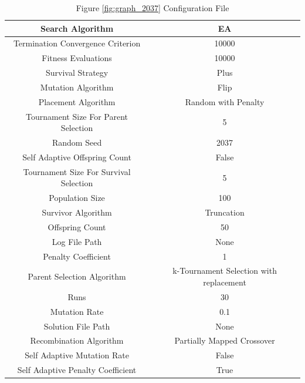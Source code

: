 \documentclass{standalone}
\begin{document}
\begin{table}[!htb]
	\centering
	\caption{Figure \ref{fig:graph_2037} Configuration File}
	\label{tab:graph_2037}
	\begin{tabular}{| c | c |}
		\hline
		Search Algorithm		& EA		 \\
		\hline
		Termination Convergence Criterion		& 10000		 \\
		\hline
		Fitness Evaluations		& 10000		 \\
		\hline
		Survival Strategy		& Plus		 \\
		\hline
		Mutation Algorithm		& Flip		 \\
		\hline
		Placement Algorithm		& Random with Penalty		 \\
		\hline
		Tournament Size For Parent Selection		& 5		 \\
		\hline
		Random Seed		& 2037		 \\
		\hline
		Self Adaptive Offspring Count		& False		 \\
		\hline
		Tournament Size For Survival Selection		& 5		 \\
		\hline
		Population Size		& 100		 \\
		\hline
		Survivor Algorithm		& Truncation		 \\
		\hline
		Offspring Count		& 50		 \\
		\hline
		Log File Path		& None		 \\
		\hline
		Penalty Coefficient		& 1		 \\
		\hline
		Parent Selection Algorithm		& k-Tournament Selection with replacement		 \\
		\hline
		Runs		& 30		 \\
		\hline
		Mutation Rate		& 0.1		 \\
		\hline
		Solution File Path		& None		 \\
		\hline
		Recombination Algorithm		& Partially Mapped Crossover		 \\
		\hline
		Self Adaptive Mutation Rate		& False		 \\
		\hline
		Self Adaptive Penalty Coefficient		& True		 \\
		\hline
	\end{tabular}
\end{table}
\end{document}
